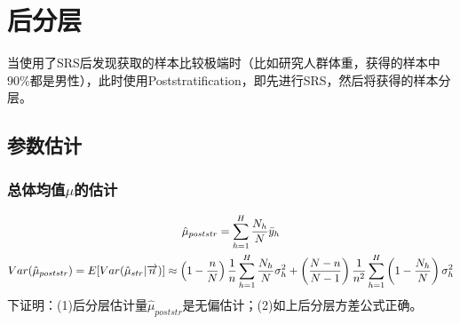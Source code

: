 \section{后分层}
当使用了SRS后发现获取的样本比较极端时（比如研究人群体重，获得的样本中$90\%$都是男性），此时使用\gls{Poststratification}，即先进行SRS，然后将获得的样本分层。

\subsection{参数估计}
\subsubsection{总体均值$\mu$的估计}
\begin{gather*}
	\hat{\mu}_{poststr}=\sum_{h=1}^H\frac{N_h}{N}\bar{y}_h \\
	Var(\hat{\mu}_{poststr})=E[Var(\hat{\mu}_{str}\arrowvert\overrightarrow{n})]\approx\left(1-\frac{n}{N}\right)\frac{1}{n}\sum_{h=1}^H\frac{N_h}{N}\sigma_h^2+\left(\frac{N-n}{N-1}\right)\frac{1}{n^2}\sum_{h=1}^H\left(1-\frac{N_h}{N}\right)\sigma_h^2
\end{gather*}
下证明：(1)后分层估计量$\hat{\mu}_{poststr}$是无偏估计；(2)如上后分层方差公式正确。
